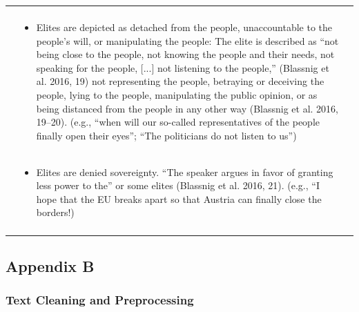 \documentclass[
]{ccr}
\begin{document}
{\begin{spacing}{1}
\begin{longtable}[]{@{}
  >{\raggedright\arraybackslash}p{.14\linewidth}
  >{\raggedright\arraybackslash}p{.62\linewidth}
  >{\raggedright\arraybackslash}p{.13\linewidth}@{}}
\begin{itemize}
\end{itemize}
&
\\
&
\begin{itemize}\item Elites are depicted as detached from the people, unaccountable to the people’s will, or manipulating the people: The elite is described as “not being close to the people, not knowing the people and their needs, not speaking for the people, [...] not listening to the people,” (Blassnig et al. 2016, 19) not representing the people, betraying or deceiving the people, lying to the people, manipulating the public opinion, or as being distanced from the people in any other way (Blassnig et al. 2016, 19–20). (e.g., “when will our so-called representatives of the people finally open their eyes”; “The politicians do not listen to us”)
\end{itemize}
&
\\
&
\begin{itemize}\item Elites are denied sovereignty. “The speaker argues in favor of granting less power to the” or some elites (Blassnig et al. 2016, 21). (e.g., “I hope that the EU breaks apart so that Austria can finally close the borders!)
\end{itemize}
&
\\
\midrule\noalign{}
\end{longtable}
\end{spacing}
}

\newpage
\renewcommand{\thefigure}{B\arabic{figure}}
\renewcommand{\thetable}{B\arabic{table}}
\setcounter{figure}{0}
\setcounter{table}{0}

\hypertarget{appendix-b}{%
\subsection{Appendix B}\label{appendix-b}}

\hypertarget{text-cleaning-and-preprocessing}{%
\subsubsection{Text Cleaning and
Preprocessing}\label{text-cleaning-and-preprocessing}}
\end{document}
